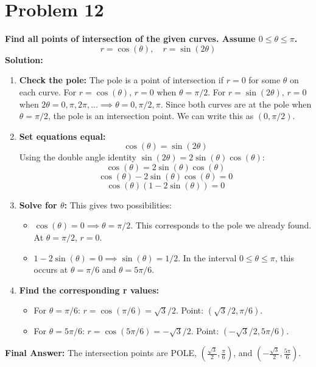 \documentclass{article}
\begin{document}
\section*{Problem 12}
\textbf{Find all points of intersection of the given curves. Assume $0 \le \theta \le \pi$.}
\[ r = \cos(\theta), \quad r = \sin(2\theta) \]
\textbf{Solution:}
\begin{enumerate}
    \item \textbf{Check the pole:} The pole is a point of intersection if $r=0$ for some $\theta$ on each curve.
    For $r=\cos(\theta)$, $r=0$ when $\theta = \pi/2$.
    For $r=\sin(2\theta)$, $r=0$ when $2\theta = 0, \pi, 2\pi, \dots \implies \theta = 0, \pi/2, \pi$.
    Since both curves are at the pole when $\theta = \pi/2$, the pole is an intersection point. We can write this as $(0, \pi/2)$.
    \item \textbf{Set equations equal:}
    \[ \cos(\theta) = \sin(2\theta) \]
    Using the double angle identity $\sin(2\theta) = 2\sin(\theta)\cos(\theta)$:
    \[ \cos(\theta) = 2\sin(\theta)\cos(\theta) \]
    \[ \cos(\theta) - 2\sin(\theta)\cos(\theta) = 0 \]
    \[ \cos(\theta) (1 - 2\sin(\theta)) = 0 \]
    \item \textbf{Solve for $\theta$:} This gives two possibilities:
    \begin{itemize}
        \item $\cos(\theta) = 0 \implies \theta = \pi/2$. This corresponds to the pole we already found. At $\theta=\pi/2$, $r=0$.
        \item $1 - 2\sin(\theta) = 0 \implies \sin(\theta) = 1/2$. In the interval $0 \le \theta \le \pi$, this occurs at $\theta = \pi/6$ and $\theta = 5\pi/6$.
    \end{itemize}
    \item \textbf{Find the corresponding r values:}
    \begin{itemize}
        \item For $\theta = \pi/6$: $r = \cos(\pi/6) = \sqrt{3}/2$. Point: $(\sqrt{3}/2, \pi/6)$.
        \item For $\theta = 5\pi/6$: $r = \cos(5\pi/6) = -\sqrt{3}/2$. Point: $(-\sqrt{3}/2, 5\pi/6)$.
    \end{itemize}
\end{enumerate}
\textbf{Final Answer:} The intersection points are POLE, $(\frac{\sqrt{3}}{2}, \frac{\pi}{6})$, and $(-\frac{\sqrt{3}}{2}, \frac{5\pi}{6})$.
\end{document}
